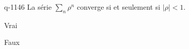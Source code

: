 \begin{truefalse}{q-1146}
La série $\sum_n \rho^n$ converge si et seulement si $|\rho|<1$. 
\item* Vrai
\item Faux
\end{truefalse}

